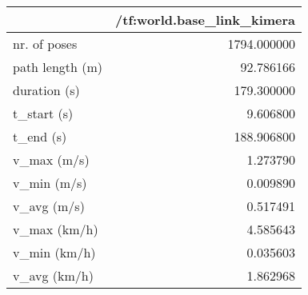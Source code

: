 \begin{tabular}{lr}
\toprule
{} &  /tf:world.base\_link\_kimera \\
\midrule
nr. of poses    &                 1794.000000 \\
path length (m) &                   92.786166 \\
duration (s)    &                  179.300000 \\
t\_start (s)     &                    9.606800 \\
t\_end (s)       &                  188.906800 \\
v\_max (m/s)     &                    1.273790 \\
v\_min (m/s)     &                    0.009890 \\
v\_avg (m/s)     &                    0.517491 \\
v\_max (km/h)    &                    4.585643 \\
v\_min (km/h)    &                    0.035603 \\
v\_avg (km/h)    &                    1.862968 \\
\bottomrule
\end{tabular}
